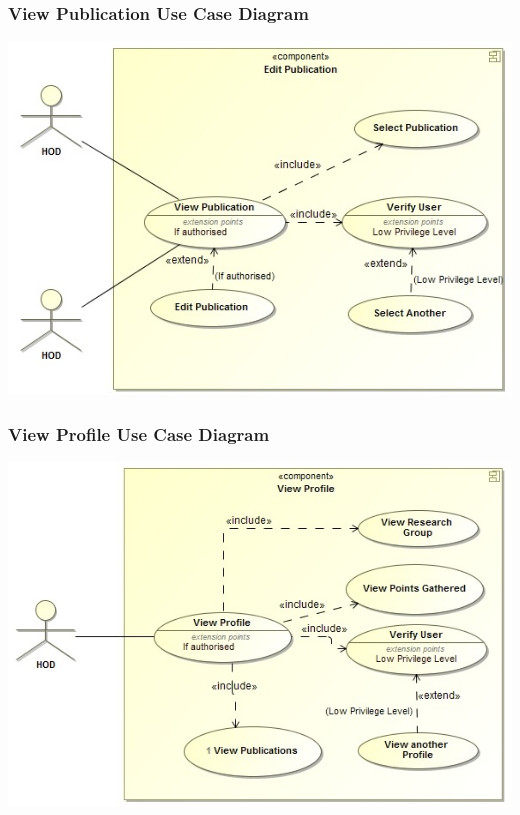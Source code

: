 \documentclass[a4paper,12pt]{article}
\begin{document}
	\subsubsection{View Publication Use Case Diagram}
	\includegraphics[width=1\textwidth]{./ViewPublication.jpg}\\[1.5cm]
	
	\subsubsection{View Profile Use Case Diagram}
	\includegraphics[width=1\textwidth]{./ViewProfile.jpg}\\[1.5cm]
	
\end{document}
